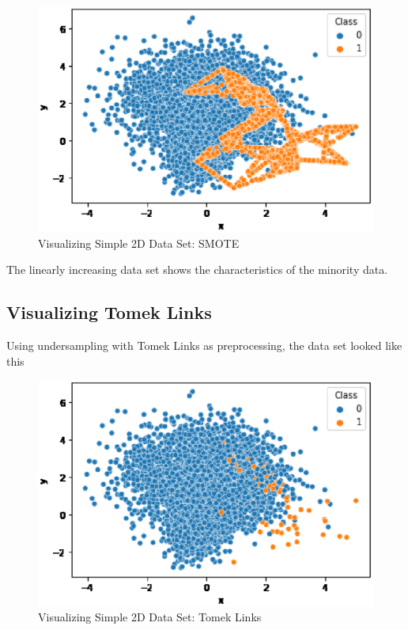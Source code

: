 \begin{center}
    \begin{figure}[ht]
        \caption{Visualizing Simple 2D Data Set: SMOTE}
        \label{tab:team-rating-features}
        \begin{center}
            \includegraphics[scale=0.6]{image/smote.eps}
        \end{center}
    \end{figure}
\end{center}

The linearly increasing data set shows the characteristics of the minority data.

\clearpage
\subsection{Visualizing Tomek Links}
Using undersampling with Tomek Links as preprocessing, the data set looked like this

\begin{center}
    \begin{figure}[ht]
        \caption{Visualizing Simple 2D Data Set: Tomek Links}
        \label{tab:team-rating-features}
        \begin{center}
            \includegraphics[scale=0.6]{image/tomek-links.eps}
        \end{center}
    \end{figure}
\end{center}

